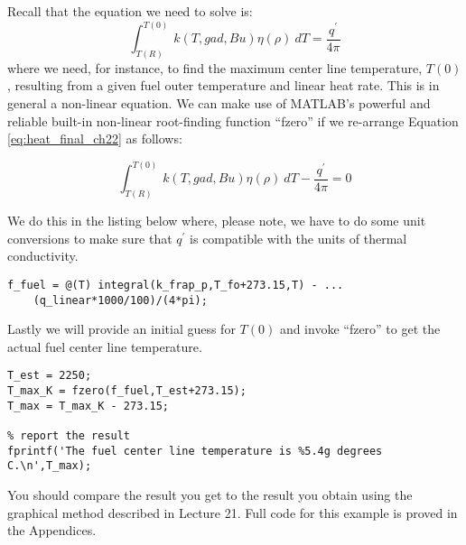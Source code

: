Recall that the equation we need to solve is:
\begin{equation}
\int_{T(R)}^{T(0)} k(T,gad,Bu)\eta(\rho) \ dT = \frac{q^{\prime}}{4 \pi}
\label{eq:heat_final_ch22}
\end{equation}
where we need, for instance, to find the maximum center line temperature, $T(0)$, resulting from a given fuel outer temperature and linear heat rate.  This is in general a non-linear equation.  We can make use of MATLAB's powerful and reliable built-in non-linear root-finding function ``fzero'' if we re-arrange Equation \ref{eq:heat_final_ch22} as follows:

\begin{equation}
\int_{T(R)}^{T(0)} k(T,gad,Bu)\eta(\rho) \ dT - \frac{q^{\prime}}{4 \pi} = 0
\end{equation}

We do this in the listing below where, please note, we have to do some unit conversions to make sure that $q^{\prime}$ is compatible with the units of thermal conductivity.

\begin{lstlisting}[caption=Set up non-linear equation for solver.]
f_fuel = @(T) integral(k_frap_p,T_fo+273.15,T) - ...
    (q_linear*1000/100)/(4*pi);
\end{lstlisting}

Lastly we will provide an initial guess for $T(0)$ and invoke ``fzero'' to get the actual fuel center line temperature.

\begin{lstlisting}[caption=Solve for fuel centerline temperature.]
T_est = 2250; 
T_max_K = fzero(f_fuel,T_est+273.15);
T_max = T_max_K - 273.15;

% report the result
fprintf('The fuel center line temperature is %5.4g degrees C.\n',T_max);
\end{lstlisting}

You should compare the result you get to the result you obtain using the graphical method described in Lecture 21.  Full code for this example is proved in the Appendices.
